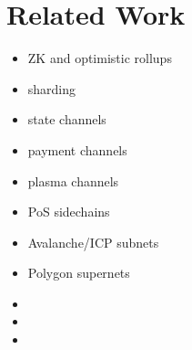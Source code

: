 \section{Related Work}

\begin{itemize}

    \item ZK and optimistic rollups
    
    \item sharding
    
    \item state channels
    
    \item payment channels
    
    \item plasma channels
    
    \item PoS sidechains
    
    \item Avalanche/ICP subnets
    
    \item Polygon supernets

    \item 

    \item 

    \item 
    
\end{itemize}